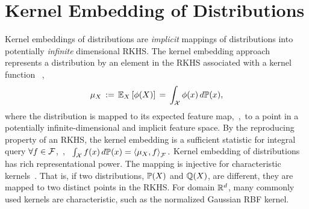 \documentclass{article}
\begin{document}
%


\vspace{-3mm}
\section{Kernel Embedding of Distributions}
\label{sec:embedding}
\vspace{-2mm}

Kernel embeddings of distributions are \emph{implicit} mappings of distributions into potentially \emph{infinite} dimensional RKHS.
The kernel embedding approach represents a distribution by an element in the RKHS associated with a kernel function \, \cite{SmoGreSonSch07},
\begin{align}
  \mu_{X} \, := \, \mathbb{E}_{X} \left[\phi(X)\right] \, = \, \int_{\mathcal{X}} \phi(x) \, d\mathbb{P}(x),  \label{eq:embedding}
\end{align}
where the distribution is mapped to its expected feature map,~\ie,~to a point in a potentially infinite-dimensional and implicit feature space.
By the reproducing property of an RKHS, the kernel embedding is a sufficient statistic for integral query $\forall f\in\mathcal{F}$,~\ie,~
$
  \int_{\mathcal{X}} f(x)\, d\mathbb{P}(x)  = \left\langle \mu_{X},f \right\rangle_{\mathcal{F}}.
$
Kernel embedding of distributions has rich representational power. The mapping is injective for characteristic kernels~\cite{SriGreFukLanetal08}. That is, if two distributions, $\mathbb{P}(X)$ and $\mathbb{Q}(X)$, are different, they are mapped to two distinct points in the RKHS. For domain $\mathbb{R}^d$, many commonly used kernels are characteristic, such as the normalized Gaussian RBF kernel.
\end{document}
